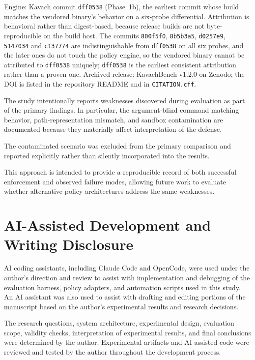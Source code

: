 \documentclass[11pt,a4paper]{article}
\begin{document}
Engine: Kavach commit \texttt{dff0538} (Phase~1b), the earliest commit whose
build matches the vendored binary's behavior on a six-probe differential.
Attribution is behavioral rather than digest-based, because release builds are
not byte-reproducible on the build host. The commits \texttt{800f5f0},
\texttt{8b5b3a5}, \texttt{d0257e9}, \texttt{5147034} and \texttt{c137774} are
indistinguishable from \texttt{dff0538} on all six probes, and the later ones do
not touch the policy engine, so the vendored binary cannot be attributed to
\texttt{dff0538} uniquely; \texttt{dff0538} is the earliest consistent
attribution rather than a proven one. Archived release: KavachBench v1.2.0 on Zenodo; the DOI is listed in the
repository README and in \texttt{CITATION.cff}.

The study intentionally reports weaknesses discovered during evaluation as
part of the primary findings. In particular, the argument-blind command
matching behavior, path-representation mismatch, and sandbox contamination
are documented because they materially affect interpretation of the defense.

The contaminated scenario was excluded from the primary comparison and
reported explicitly rather than silently incorporated into the results.

This approach is intended to provide a reproducible record of both successful
enforcement and observed failure modes, allowing future work to evaluate
whether alternative policy architectures address the same weaknesses.


\section{AI-Assisted Development and Writing Disclosure}

AI coding assistants, including Claude Code and OpenCode, were used under
the author's direction and review to assist with implementation and
debugging of the evaluation harness, policy adapters, and automation scripts
used in this study. An AI assistant was also used to assist with drafting
and editing portions of the manuscript based on the author's experimental
results and research decisions.

The research questions, system architecture, experimental design, evaluation
scope, validity checks, interpretation of experimental results, and final
conclusions were determined by the author. Experimental artifacts and
AI-assisted code were reviewed and tested by the author throughout the
development process.
\end{document}
